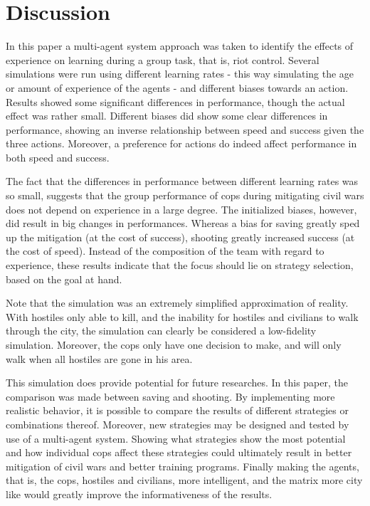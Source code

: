 \section{Discussion}
In this paper a multi-agent system approach was taken to identify the effects of experience on learning during a group task, that is, riot control. Several simulations were run using different learning rates - this way simulating the age or amount of experience of the agents - and different biases towards an action. Results showed some significant differences in performance, though the actual effect was rather small. Different biases did show some clear differences in performance, showing an inverse relationship between speed and success given the three actions. Moreover, a preference for actions do indeed affect performance in both speed and success. 

The fact that the differences in performance between different learning rates was so small, suggests that the group performance of cops during mitigating civil wars does not depend on experience in a large degree. The initialized biases, however, did result in big changes in performances. Whereas a bias for saving greatly sped up the mitigation (at the cost of success), shooting greatly increased success (at the cost of speed). Instead of the composition of the team with regard to experience, these results indicate that the focus should lie on strategy selection, based on the goal at hand. 

Note that the simulation was an extremely simplified approximation of reality. With hostiles only able to kill, and the inability for hostiles and civilians to walk through the city, the simulation can clearly be considered a low-fidelity simulation. Moreover, the cops only have one decision to make, and will only walk when all hostiles are gone in his area.

This simulation does provide potential for future researches. In this paper, the comparison was made between saving and shooting. By implementing more realistic behavior, it is possible to compare the results of different strategies or combinations thereof. Moreover, new strategies may be designed and tested by use of a multi-agent system. Showing what strategies show the most potential and how individual cops affect these strategies could ultimately result in better mitigation of civil wars and better training programs. Finally making the agents, that is, the cops, hostiles and civilians, more intelligent, and the matrix more city like would greatly improve the informativeness of the results.

